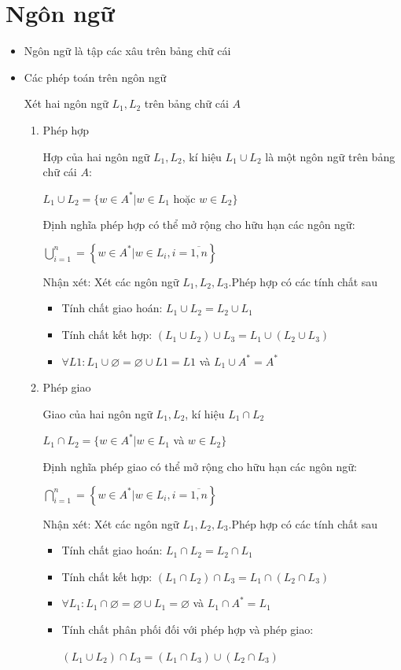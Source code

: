 \documentclass[14pt]{extreport}
\begin{document}
\section{Ngôn ngữ}
\begin{itemize}
\item Ngôn ngữ là tập các xâu trên bảng chữ cái
\item Các phép toán trên ngôn ngữ

Xét hai ngôn ngữ $L_1,L_2$ trên bảng chữ cái $A$
\begin{enumerate}
\item Phép hợp

Hợp của hai ngôn ngữ $L_1,L_2$, kí hiệu $L_1\cup L_2$ là một ngôn ngữ trên bảng chữ cái $A$:

\begin{center}
$L_1\cup L_2=\{w\in A^*|w\in L_1$ hoặc $ w\in L_2\}$
\end{center}

Định nghĩa phép hợp có thể mở rộng cho hữu hạn các ngôn ngữ:
\begin{center}
$\bigcup_{i=1}^n =\left\{w\in A^*|w\in L_i, i=\overline{1,n}\right\}$
\end{center}

Nhận xét: Xét các ngôn ngữ $L_1,L_2,L_3$.Phép hợp có các tính chất sau
\begin{itemize}
\item Tính chất giao hoán: $L_1\cup L_2=L_2\cup L_1$
\item Tính chất kết hợp: $\left(L_1\cup L_2 \right)\cup L_3=L_1\cup \left(L_2\cup L_3 \right)$
\item $\forall L1:L_1\cup \varnothing =\varnothing \cup L1=L1$ và $L_1 \cup A^*=A^*$
\end{itemize}

\item Phép giao

Giao của hai ngôn ngữ $L_1,L_2$, kí hiệu $L_1\cap L_2$
\begin{center}
$L_1\cap L_2=\{w\in A^*|w\in L_1$ và $ w\in L_2\}$
\end{center}
Định nghĩa phép giao có thể mở rộng cho hữu hạn các ngôn ngữ:
\begin{center}
$\bigcap_{i=1}^n =\left\{w\in A^*|w\in L_i, i=\overline{1,n}\right\}$
\end{center}

Nhận xét: Xét các ngôn ngữ $L_1,L_2,L_3$.Phép hợp có các tính chất sau
\begin{itemize}
\item Tính chất giao hoán: $L_1\cap L_2=L_2\cap L_1$
\item Tính chất kết hợp: $\left(L_1\cap L_2 \right)\cap L_3=L_1\cap \left(L_2\cap L_3 \right)$
\item $\forall L_1:L_1\cap \varnothing =\varnothing \cup L_1=\varnothing$ và $L_1 \cap A^*=L_1$
\item Tính chất phân phối đối với phép hợp và phép giao:
\begin{center}
$\left(L_1\cup L_2\right)\cap L_3=\left(L_1\cap L_3 \right)\cup \left(L_2 \cap L_3\right)$


\end{center}
\end{itemize}
\end{enumerate}
\end{itemize}
\end{document}
